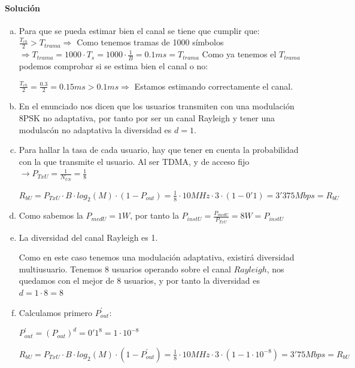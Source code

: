 \documentclass[fleqn,14pt]{article}
\begin{document}
\paragraph{Soluci\'on}
\begin{enumerate}[a)]
  \item Para que se pueda estimar bien el canal se tiene que cumplir que:
  $\frac{T_{ch}}{2} > T_{trama} \Rightarrow$ Como tenemos tramas de 1000 s\'imbolos $\Rightarrow T_{trama} = 1000 \cdot T_{s} = 1000 \cdot \frac{1}{B} = \boxed{0.1ms = T_{trama}}$
  Como ya tenemos el $T_{trama}$ podemos comprobar si se estima bien el canal o no:

  \centering
  $\frac{T_{ch}}{2} = \frac{0.3}{2} = 0.15 ms > 0.1 ms \Rightarrow$ Estamos estimando correctamente el canal.

  \raggedright
  \item En el enunciado nos dicen que los usuarios transmiten con una modulaci\'on 8PSK no adaptativa, por tanto por ser un canal Rayleigh y tener una modulac\'on no adaptativa la diversidad es $d=1$.

  \item Para hallar la tasa de cada usuario, hay que tener en cuenta la probabilidad con la que transmite el usuario. Al ser TDMA, y de acceso fijo $\rightarrow P_{TxU} = \frac{1}{N_{US}} = \frac{1}{8}$
  \begin{center}
    $R_{bU} = P_{TxU} \cdot B \cdot log_2(M) \cdot (1 - P_{out}) = \frac{1}{8} \cdot 10MHz \cdot 3 \cdot (1 - 0'1) = \boxed{3'375 Mbps = R_{bU}}$
  \end{center}

  \item Como sabemos la $P_{medU} = 1W$, por tanto la $P_{instU} = \frac{P_{medU}}{P_{TxU}} = \boxed{8 W = P_{instU}}$

  \item La diversidad del canal Rayleigh es 1.

  Como en este caso tenemos una modulaci\'on adaptativa, existir\'a diversidad multiusuario. Tenemos 8 usuarios operando sobre el canal $Rayleigh$, nos quedamos con el mejor de 8 usuarios, y por tanto la diversidad es $d=1 \cdot 8=8$

  \item Calculamos primero $P_{out}^{'}$:
  \begin{center}
    $P_{out}^{'} = (P_{out})^{d} = 0'1^8 = 1 \cdot 10^{-8}$

    $R_{bU} = P_{TxU} \cdot B \cdot log_2(M) \cdot (1 - P_{out}^{'}) = \frac{1}{8} \cdot 10MHz \cdot 3 \cdot (1 - 1 \cdot 10^{-8}) = \boxed{3'75 Mbps = R_{bU}}$
  \end{center}
\end{enumerate}
\end{document}
